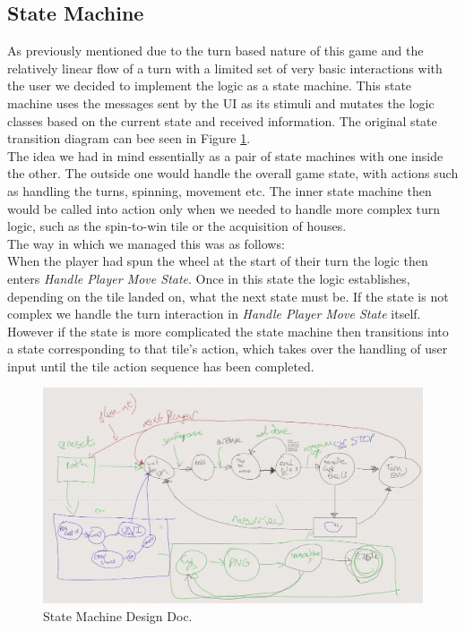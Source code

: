 \documentclass[a4paper, 11pt]{article}
\begin{document}
	\subsection*{State Machine}
	As previously mentioned due to the turn based nature of this game and the relatively linear flow of a turn with a limited set of very basic interactions with the user we decided to implement the logic as a state machine. This state machine uses the messages sent by the UI as its stimuli and mutates the logic classes based on the current state and received information. The original state transition diagram can bee seen in Figure \ref{fig:state_machine}.\\
	The idea we had in mind essentially as a pair of state machines with one inside the other. The outside one would handle the overall game state, with actions such as handling the turns, spinning, movement etc. The inner state machine then would be called into action only when we needed to handle more complex turn logic, such as the spin-to-win tile or the acquisition of houses.\\
	The way in which we managed this was as follows:\\
	When the player had spun the wheel at the start of their turn the logic then enters \textit{Handle Player Move State}. Once in this state the logic establishes, depending on the tile landed on, what the next state must be. If the state is not complex we handle the turn interaction in \textit{Handle Player Move State} itself. However if the state is more complicated the state machine then transitions into a state corresponding to that tile's action, which takes over the handling of user input until the tile action sequence has been completed.
	\begin{figure}[!h]
		\centering
		\includegraphics[scale=.4]{highlevel_state_diagram}
		\caption{State Machine Design Doc.}
		\label{fig:state_machine}
	\end{figure}
\end{document}
